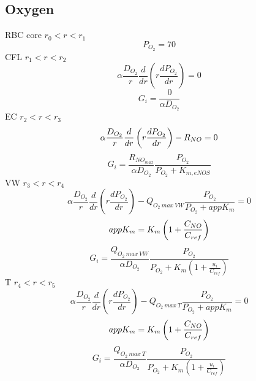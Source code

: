 \subsection{Oxygen}
RBC core $r_0 < r < r_1$
\begin{equation*}
P_{O_2}=70
\end{equation*}
CFL $r_1<r<r_2$
\begin{equation*}
\alpha \frac{D_{O_2}}{r} \frac{d}{dr} \left (r \frac{dP_{O_2}}{dr} \right) = 0
\end{equation*}
\begin{equation*}
G_i = \frac{0}{\alpha D_{O_2}}
\end{equation*}
EC $r_2<r<r_3$
\begin{equation*}
\alpha \frac{D_{O_2}}{r} \frac{d}{dr} \left (r \frac{dP_{O_2}}{dr} \right) - 
R_{NO} = 0
\end{equation*}
\begin{equation*}
G_i = \frac{R_{NO_{max}}}{\alpha D_{O_2}} \frac{P_{O_2}}{P_{O_2} +
  K_{m, eNOS}}
\end{equation*}
VW $r_3<r<r_4$
\begin{equation*}
\alpha \frac{D_{O_2}}{r} \frac{d}{dr} \left (r \frac{dP_{O_2}}{dr} \right) - 
Q_{O_2\:max\:VW} \frac{P_{O_2}}{P_{O_2} + appK_m} = 0
\end{equation*}
\begin{equation}
appK_m = K_m \left (1 + \frac{C_{NO}}{C_{ref}} \right)
\end{equation}
\begin{equation*}
G_i = \frac{Q_{O_2\:max\:VW}}{\alpha D_{O_2}} \frac{P_{O_2}}{P_{O_2} + K_m 
  \left (1 + \frac{u_i}{C_{ref}} \right)}
\end{equation*}
T $r_4<r<r_5$
\begin{equation*}
\alpha \frac{D_{O_2}}{r} \frac{d}{dr} \left (r \frac{dP_{O_2}}{dr} \right) - 
Q_{O_2\:max\:T} \frac{P_{O_2}}{P_{O_2} + appK_m} = 0
\end{equation*}
\begin{equation}
appK_m = K_m \left (1 + \frac{C_{NO}}{C_{ref}} \right)
\end{equation}
\begin{equation*}
G_i = \frac{Q_{O_2\:max\:T}}{\alpha D_{O_2}} \frac{P_{O_2}}{P_{O_2} + K_m 
  \left (1 + \frac{u_i}{C_{ref}} \right)}
\end{equation*}

